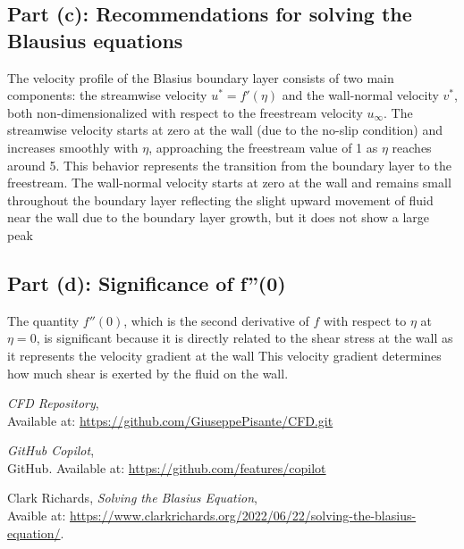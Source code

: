 \documentclass{article}
\begin{document}
\subsection*{Part (c): Recommendations for solving the Blausius equations}
The velocity profile of the Blasius boundary layer consists of two main components: the streamwise velocity \( u^* = f'(\eta) \) and the wall-normal velocity \( v^* \), 
both non-dimensionalized with respect to the freestream velocity \( u_\infty \). The streamwise velocity starts at zero at the wall (due to the no-slip condition) and increases 
smoothly with \( \eta \), approaching the freestream value of 1 as \( \eta \) reaches around 5. This behavior represents the transition from the boundary layer to the freestream. 
The wall-normal velocity starts at zero at the wall and remains small throughout the boundary layer reflecting the slight upward movement of fluid near the wall due to the boundary layer growth, but it does not show a large peak

\subsection*{Part (d): Significance of f''(0)}
The quantity \( f''(0) \), which is the second derivative of \( f \) with respect to \( \eta \) at \( \eta = 0 \), is significant
because it is directly related to the shear stress at the wall as it represents the velocity gradient at the wall
This velocity gradient determines how much shear is exerted by the fluid on the wall. 

\begin{thebibliography}{9}
    \textit{CFD Repository},\\
    Available at: \url{https://github.com/GiuseppePisante/CFD.git}
    
    \textit{GitHub Copilot},\\
    GitHub. Available at: \url{https://github.com/features/copilot}

     Clark Richards, 
    \textit{Solving the Blasius Equation},\\
    Avaible at: \url{https://www.clarkrichards.org/2022/06/22/solving-the-blasius-equation/}.
    \end{thebibliography}
       
\end{document}
